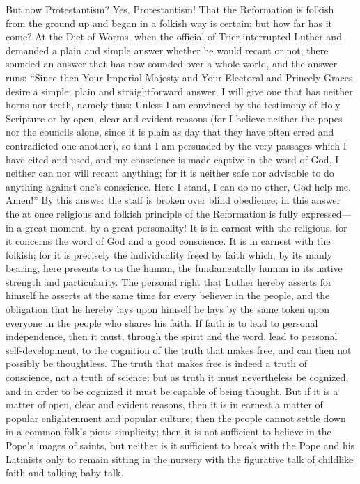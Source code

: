 \documentclass[12pt]{book}
\newcommand{\opage}[1]{\marginnote{\footnotesize\textit{[#1]}}}
\begin{document}
But now Protestantism? Yes, Protestantism! That the Reformation is
folkish from the ground up and began in a folkish way is certain; but
how far has it come? At the Diet of Worms, when the official of Trier
interrupted Luther and demanded a plain and simple answer whether he
would recant or not, there sounded an answer that has now sounded over
a whole world, and the answer runs: ``Since then Your Imperial Majesty
and Your Electoral and Princely Graces desire a simple, plain and
straightforward answer, I will give one that has neither horns nor
teeth, namely thus: Unless I am convinced by the testimony of Holy
Scripture or by open, clear and evident reasons (for I believe neither
the popes nor the councils alone, since it is plain as day that they
have often erred and contradicted one another), so that I am persuaded
by the very passages which I have cited and used, and my conscience is
made captive in the word of God, I neither can nor will recant anything;
for it is neither safe nor advisable to do anything against one's
conscience. Here I stand, I can do no other, God help me. Amen!'' By
this answer the staff is broken over blind obedience; in this answer the
at once religious and folkish principle of the Reformation is fully
expressed---in a great moment, by a great personality! It is in earnest
with the religious, for it concerns
\opage{126}\setcounter{footnote}{0}%
the word of God and a good conscience. It is in earnest with the
folkish; for it is precisely the individuality freed by faith which,
by its manly bearing, here presents to us the human, the fundamentally
human in its native strength and particularity. The personal right that
Luther hereby asserts for himself he asserts at the same time for every
believer in the people, and the obligation that he hereby lays upon
himself he lays by the same token upon everyone in the people who shares
his faith. If faith is to lead to personal independence, then it must,
through the spirit and the word, lead to personal self-development, to
the cognition of the truth that makes free, and can then not possibly
be thoughtless. The truth that makes free is indeed a truth of
conscience, not a truth of science; but as truth it must nevertheless be
cognized, and in order to be cognized it must be capable of being
thought. But if it is a matter of open, clear and evident reasons, then
it is in earnest a matter of popular enlightenment and popular culture;
then the people cannot settle down in a common folk's pious simplicity;
then it is not sufficient to believe in the Pope's images of saints, but
neither is it sufficient to break with the Pope and his Latinists only
to remain sitting in the nursery with the figurative talk of childlike
faith and talking baby talk.
\end{document}
